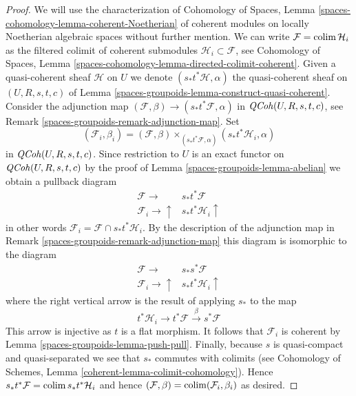 \begin{proof}
We will use the characterization of Cohomology of Spaces, Lemma
\ref{spaces-cohomology-lemma-coherent-Noetherian} of coherent modules
on locally Noetherian algebraic spaces without further mention. We can write
$\mathcal{F} = \operatorname{colim} \mathcal{H}_i$ as the filtered colimit
of coherent submodules $\mathcal{H}_i \subset \mathcal{F}$, see
Cohomology of Spaces, Lemma
\ref{spaces-cohomology-lemma-directed-colimit-coherent}.
Given a quasi-coherent sheaf $\mathcal{H}$ on $U$ we denote
$(s_*t^*\mathcal{H}, \alpha)$ the quasi-coherent sheaf on $(U, R, s, t, c)$ of
Lemma \ref{spaces-groupoids-lemma-construct-quasi-coherent}. Consider the adjunction map
$(\mathcal{F}, \beta) \to (s_*t^*\mathcal{F}, \alpha)$ in
$\mathit{QCoh}(U, R, s, t, c)$, see Remark \ref{spaces-groupoids-remark-adjunction-map}.
Set
$$
(\mathcal{F}_i, \beta_i) =
(\mathcal{F}, \beta)
\times_{(s_*t^*\mathcal{F}, \alpha)}
(s_*t^*\mathcal{H}_i, \alpha)
$$
in $\mathit{QCoh}(U, R, s, t, c)$. Since restriction to $U$ is an exact functor
on $\mathit{QCoh}(U, R, s, t, c)$  by the proof of Lemma \ref{spaces-groupoids-lemma-abelian}
we obtain a pullback diagram
$$
\begin{array}{cc}\mathcal{F} \longrightarrow & s_*t^*\mathcal{F} \\ \mathcal{F}_i \longrightarrow\uparrow & s_*t^*\mathcal{H}_i \uparrow\end{array}
$$
in other words $\mathcal{F}_i = \mathcal{F} \cap s_*t^*\mathcal{H}_i$.
By the description of the adjunction map in Remark \ref{spaces-groupoids-remark-adjunction-map}
this diagram is isomorphic to the diagram
$$
\begin{array}{cc}\mathcal{F} \longrightarrow & s_*s^*\mathcal{F} \\ \mathcal{F}_i \longrightarrow\uparrow & s_*t^*\mathcal{H}_i \uparrow\end{array}
$$
where the right vertical arrow is the result of applying $s_*$ to the map
$$
t^*\mathcal{H}_i \to t^*\mathcal{F} \xrightarrow{\beta} s^*\mathcal{F}
$$
This arrow is injective as $t$ is a flat morphism. It follows that
$\mathcal{F}_i$ is coherent by Lemma \ref{spaces-groupoids-lemma-push-pull}.
Finally, because $s$ is quasi-compact and quasi-separated we see that
$s_*$ commutes with colimits (see
Cohomology of Schemes, Lemma \ref{coherent-lemma-colimit-cohomology}).
Hence $s_*t^*\mathcal{F} = \operatorname{colim} s_*t^*\mathcal{H}_i$ and hence
$(\mathcal{F}, \beta) = \operatorname{colim} (\mathcal{F}_i, \beta_i)$ as desired.
\end{proof}

